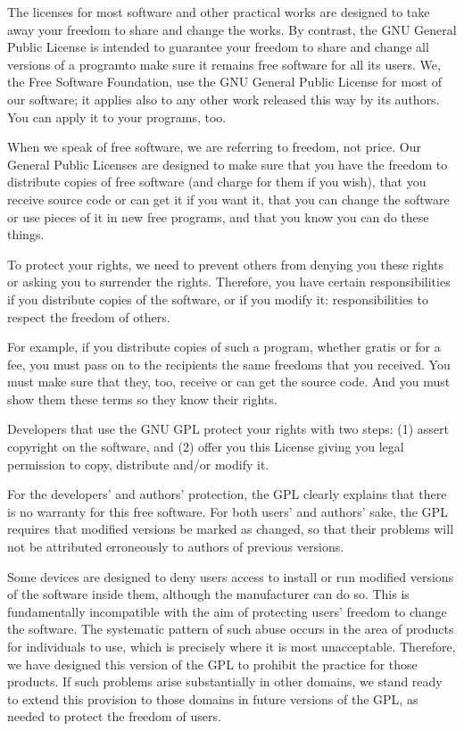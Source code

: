 \documentclass[letterpaper,10pt,english]{sphinxmanual}
\begin{document}
The licenses for most software and other practical works are designed
to take away your freedom to share and change the works.  By contrast,
the GNU General Public License is intended to guarantee your freedom to
share and change all versions of a program\textendash{}to make sure it remains free
software for all its users.  We, the Free Software Foundation, use the
GNU General Public License for most of our software; it applies also to
any other work released this way by its authors.  You can apply it to
your programs, too.

When we speak of free software, we are referring to freedom, not
price.  Our General Public Licenses are designed to make sure that you
have the freedom to distribute copies of free software (and charge for
them if you wish), that you receive source code or can get it if you
want it, that you can change the software or use pieces of it in new
free programs, and that you know you can do these things.

To protect your rights, we need to prevent others from denying you
these rights or asking you to surrender the rights.  Therefore, you have
certain responsibilities if you distribute copies of the software, or if
you modify it: responsibilities to respect the freedom of others.

For example, if you distribute copies of such a program, whether
gratis or for a fee, you must pass on to the recipients the same
freedoms that you received.  You must make sure that they, too, receive
or can get the source code.  And you must show them these terms so they
know their rights.

Developers that use the GNU GPL protect your rights with two steps:
(1) assert copyright on the software, and (2) offer you this License
giving you legal permission to copy, distribute and/or modify it.

For the developers’ and authors’ protection, the GPL clearly explains
that there is no warranty for this free software.  For both users’ and
authors’ sake, the GPL requires that modified versions be marked as
changed, so that their problems will not be attributed erroneously to
authors of previous versions.

Some devices are designed to deny users access to install or run
modified versions of the software inside them, although the manufacturer
can do so.  This is fundamentally incompatible with the aim of
protecting users’ freedom to change the software.  The systematic
pattern of such abuse occurs in the area of products for individuals to
use, which is precisely where it is most unacceptable.  Therefore, we
have designed this version of the GPL to prohibit the practice for those
products.  If such problems arise substantially in other domains, we
stand ready to extend this provision to those domains in future versions
of the GPL, as needed to protect the freedom of users.
\end{document}
